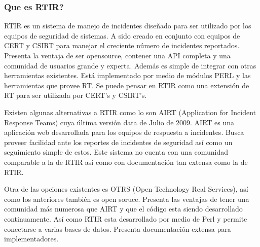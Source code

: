 \subsubsection{Que es RTIR?}
RTIR es un sistema de manejo de incidentes diseñado para ser utilizado por los 
equipos de seguridad de sistemas. A sido creado en conjunto con equipos de CERT 
y CSIRT para manejar el creciente número de incidentes reportados.
Presenta la ventaja de ser opensource, contener una API completa y una comunidad 
de usuarios grande y experta. Además es simple de integrar con otras 
herramientas existentes. Está implementado por medio de módulos PERL y las 
herramientas que provee RT. Se puede pensar en RTIR como una extensión de RT 
para ser utilizada por CERT's y CSIRT's.

Existen algunas alternativas a RTIR como lo son AIRT (Application for Incident Response Teams) 
cuya última versión data de Julio de 2009. AIRT es una aplicación web 
desarrollada para los equipos de respuesta a incidentes. Busca proveer facilidad 
ante los reportes de incidentes de seguridad así como un seguimiento simple de 
estos. Este sistema no cuenta con una comunidad comparable a la de RTIR así como 
con documentación tan extensa como la de RTIR.

Otra de las opciones existentes es OTRS (Open Technology Real Services), así 
como los anteriores también es open soruce. Presenta las ventajas de tener una 
comunidad más numerosa que AIRT y que el código esta siendo desarrollado continuamente. 
Así como RTIR esta desarrollado por medio de Perl y permite conectarse a varias 
bases de datos. Presenta documentación extensa para implementadores.